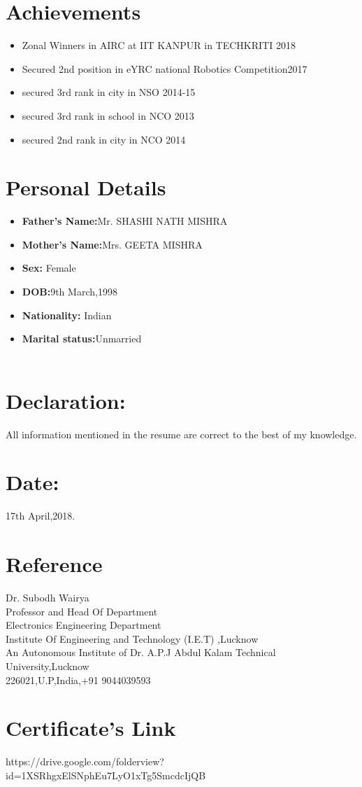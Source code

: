 \documentclass[11pt]{article}
\begin{document}
\section{Achievements}
\begin{itemize}
\item Zonal Winners in AIRC at IIT KANPUR in TECHKRITI 2018
\item Secured 2nd position in eYRC national Robotics Competition2017
\item secured 3rd rank in city in NSO 2014-15
\item secured 3rd rank in school in NCO 2013
\item secured 2nd rank in city in NCO  2014
\end{itemize}
\section{Personal Details}
\begin{itemize}
\item \textbf{Father's Name:}Mr. SHASHI NATH MISHRA
\newpage
\item \textbf{Mother's Name:}Mrs. GEETA MISHRA

\item \textbf{Sex:} Female
\item\textbf{ DOB:}9th March,1998
\item \textbf{Nationality:} Indian
\item \textbf{Marital status:}Unmarried      \\
\\
\newpage

\end{itemize}
\section{Declaration:}All information mentioned in the resume are correct to the best of my knowledge.\\

\section{Date:}17th April,2018.


\section{Reference}
\begin{flushleft}
Dr. Subodh Wairya \\
Professor and Head Of Department \\
Electronics Engineering Department \\
Institute Of Engineering and Technology (I.E.T) ,Lucknow \\
An Autonomous Institute of Dr. A.P.J Abdul Kalam Technical University,Lucknow \\
226021,U.P,India,+91 9044039593
\end{flushleft}
\section{Certificate's Link}
https://drive.google.com/folderview?id=1XSRhgxElSNphEu7LyO1xTg5SmcdcIjQB
\end{document}
